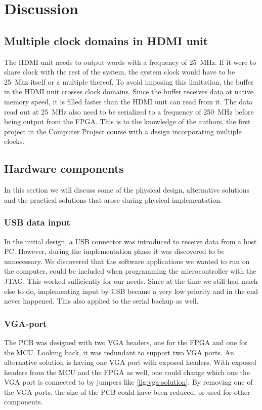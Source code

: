 \documentclass[../main/report.tex]{subfiles}
\begin{document}
\chapter{Discussion}

\section{Multiple clock domains in HDMI unit}
The HDMI unit needs to output words with a frequency of \SI{25}{MHz}.
If it were to share clock with the rest of the system, the system clock would have to be \SI{25}{Mhz} itself or a multiple thereof.
To avoid imposing this limitation, the buffer in the HDMI unit crosses clock domains.
Since the buffer receives data at native memory speed, it is filled faster than the HDMI unit can read from it.
The data read out at \SI{25}{MHz} also need to be serialized to a frequency of \SI{250}{MHz} before being output from the FPGA.
This is to the knowledge of the authors, the first project in the Computer Project course with a design incorporating multiple clocks.

\section{Hardware components}
In this section we will discuss some of the physical design, alternative solutions and the practical solutions that arose during physical implementation.

\subsection*{USB data input}
In the initial design, a USB connector was introduced to receive data from a host PC. 
However, during the implementation phase it was discovered to be unnecessary.
We discovered that the software applications we wanted to run on the computer, could be included when programming the microcontroller with the JTAG.
This worked sufficiently for our needs. 
Since at the time we still had much else to do, implementing input by USB became a very low priority and in the end never happened.
This also applied to the serial backup as well.

\subsection*{VGA-port}
The PCB was designed with two VGA headers, one for the FPGA and one for the MCU. 
Looking back, it was redundant to support two VGA ports.
An alternative solution is having one VGA port with exposed headers.
With exposed headers from the MCU and the FPGA as well, one could change which one the VGA port is connected to by jumpers like \ref{fig:vga-solution}.
By removing one of the VGA ports, the size of the PCB could have been reduced, or used for other components. 
\end{document}
